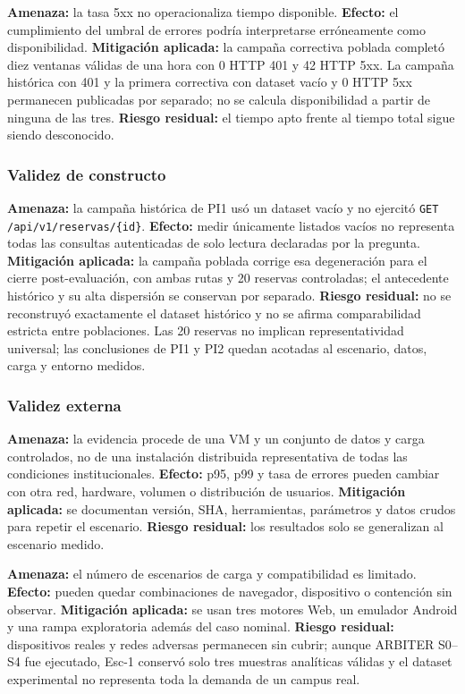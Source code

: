 \textbf{Amenaza:} la tasa 5xx no operacionaliza tiempo disponible.
\textbf{Efecto:} el cumplimiento del umbral de errores podría interpretarse
erróneamente como disponibilidad. \textbf{Mitigación aplicada:} la campaña
correctiva poblada completó diez ventanas válidas de una hora con 0 HTTP 401 y
42 HTTP 5xx. La campaña histórica con 401 y la primera correctiva con dataset
vacío y 0 HTTP 5xx permanecen publicadas por separado; no se calcula
disponibilidad a partir de ninguna de las tres.
\textbf{Riesgo residual:} el tiempo apto frente al tiempo total sigue siendo
desconocido.

\subsubsection{Validez de constructo}

\textbf{Amenaza:} la campaña histórica de PI1 usó un dataset vacío y no
ejercitó \texttt{GET /api/v1/reservas/\{id\}}.
\textbf{Efecto:} medir únicamente listados vacíos no representa todas las
consultas autenticadas de solo lectura declaradas por la pregunta.
\textbf{Mitigación aplicada:} la campaña poblada corrige esa degeneración
para el cierre post-evaluación, con ambas rutas y 20 reservas controladas;
el antecedente histórico y su alta dispersión se conservan por separado.
\textbf{Riesgo residual:} no se reconstruyó exactamente el dataset histórico
y no se afirma comparabilidad estricta entre poblaciones. Las 20 reservas
no implican representatividad universal; las conclusiones de PI1 y PI2
quedan acotadas al escenario, datos, carga y entorno medidos.

\subsubsection{Validez externa}

\textbf{Amenaza:} la evidencia procede de una VM y un conjunto de datos y carga
controlados, no de una instalación distribuida representativa de todas las
condiciones institucionales. \textbf{Efecto:} p95, p99 y tasa de errores pueden
cambiar con otra red, hardware, volumen o distribución de usuarios.
\textbf{Mitigación aplicada:} se documentan versión, SHA, herramientas,
parámetros y datos crudos para repetir el escenario. \textbf{Riesgo residual:}
los resultados solo se generalizan al escenario medido.

\textbf{Amenaza:} el número de escenarios de carga y compatibilidad es limitado.
\textbf{Efecto:} pueden quedar combinaciones de navegador, dispositivo o
contención sin observar. \textbf{Mitigación aplicada:} se usan tres motores Web,
un emulador Android y una rampa exploratoria además del caso nominal.
\textbf{Riesgo residual:} dispositivos reales y redes adversas permanecen sin
cubrir; aunque ARBITER S0--S4 fue ejecutado, Esc-1 conservó solo tres muestras
analíticas válidas y el dataset experimental no representa toda la demanda de
un campus real.

